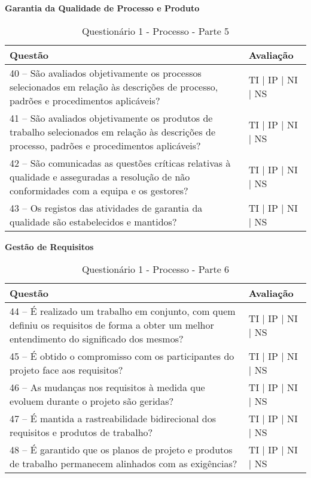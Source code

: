 \documentclass[openany,10pt,a4paper]{article}
\begin{document}
\begin{appendix}
\begin{table}[h]
\textbf{Garantia da Qualidade de Processo e Produto}
	\centering
	\caption{Questionário 1 - Processo - Parte 5}
	\begin{tabular}{p{3.5in}p{2in}}		
		\toprule
		\textbf{Questão}  & \textbf{Avaliação}\\ 
		\midrule
		40 – São avaliados objetivamente os processos selecionados em relação às descrições de 
processo, padrões e procedimentos aplicáveis?
 & TI | IP | NI | NS \\
        \midrule
		41 – São avaliados objetivamente os produtos de trabalho selecionados em relação às descrições 
de processo, padrões e procedimentos aplicáveis?
 & TI | IP | NI | NS \\
		\midrule
		42 – São comunicadas as questões críticas relativas à qualidade e asseguradas a resolução de 
não conformidades com a equipa e os gestores?
 & TI | IP | NI | NS \\
		\midrule
        43 – Os registos das atividades de garantia da qualidade são estabelecidos e mantidos?
 & TI | IP | NI | NS \\
		\bottomrule
	\end{tabular} 
	\label{tab:tabela1}
\end{table}

\begin{table}[h]
\textbf{Gestão de Requisitos}
	\centering
	\caption{Questionário 1 - Processo - Parte 6}
	\begin{tabular}{p{3.5in}p{2in}}		
		\toprule
		\textbf{Questão}  & \textbf{Avaliação}\\ 
		\midrule
		44 – É realizado um trabalho em conjunto, com quem definiu os requisitos de forma a obter um 
melhor entendimento do significado dos mesmos?
 & TI | IP | NI | NS \\
        \midrule
		45 – É obtido o compromisso com os participantes do projeto face aos requisitos?
 & TI | IP | NI | NS \\
		\midrule
		46 – As mudanças nos requisitos à medida que evoluem durante o projeto são geridas?
 & TI | IP | NI | NS \\
		\midrule
        47 – É mantida a rastreabilidade bidirecional dos requisitos e produtos de trabalho?
 & TI | IP | NI | NS \\
		\midrule
		48 – É garantido que os planos de projeto e produtos de trabalho permanecem alinhados com 
as exigências?
  & TI | IP | NI | NS \\
		\bottomrule
	\end{tabular} 
	\label{tab:tabela1}
\end{table}


\end{appendix}
\end{document}
